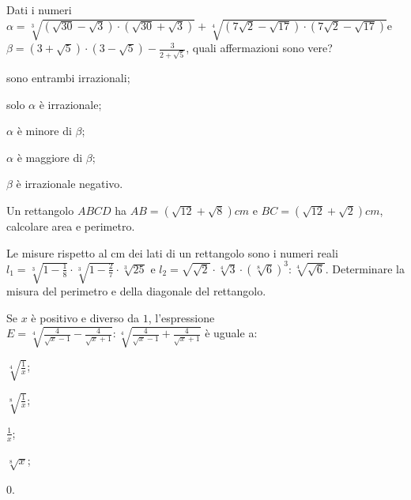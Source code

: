 \begin{esercizio}%
Dati i numeri\quad $\alpha =\sqrt[3]{(\sqrt{30}-\sqrt 3)\cdot (\sqrt{30}+\sqrt 3)}+\sqrt[4]{(7\sqrt 2-\sqrt{17})\cdot (7\sqrt 2-\sqrt{17})}$\quad e $\beta =(3+\sqrt 5)\cdot (3-\sqrt 5)-\frac 3{2+\sqrt 5}$, quali affermazioni sono vere?
\begin{multicols}{2}
\begin{enumeratea}
 \item sono entrambi irrazionali;
 \item solo $\alpha$ è irrazionale;
 \item $\alpha$ è minore di $\beta$;
 \item $\alpha$ è maggiore di $\beta$;
 \item $\beta$ è irrazionale negativo.
\end{enumeratea}
\end{multicols}
\end{esercizio}

\begin{esercizio}%
Un rettangolo $ABCD$ ha $AB=(\sqrt{12}+\sqrt{8})\unit{cm}$ e $BC=(\sqrt{12}+\sqrt{2})\unit{cm}$, calcolare area e perimetro.
\end{esercizio}

\begin{esercizio}%
Le misure rispetto al cm dei lati di un rettangolo sono i numeri reali $l_1=\sqrt[3]{1-\frac 1 8}\cdot \sqrt[3]{1-\frac 2 7}\cdot \sqrt[3]{25}$ e $l_2=\sqrt{\sqrt 2}\cdot \sqrt[4]3\cdot (\sqrt[8]6)^3:\sqrt[4]{\sqrt 6}$. Determinare la misura del perimetro e della diagonale del rettangolo.
\end{esercizio}

\begin{esercizio}%
Se $x$ è positivo e diverso da $1$, l'espressione $E=\sqrt[4]{\frac 4{\sqrt x-1}-\frac 4{\sqrt x+1}}:\sqrt[4]{\frac 4{\sqrt x-1}+\frac 4{\sqrt x+1}}$ è uguale a:
\begin{multicols}{5}
\begin{enumeratea}
 \item $\sqrt[4]{\frac 1 x}$;
 \item $\sqrt[8]{\frac 1 x}$;
 \item $\frac 1 x$;
 \item $\sqrt[8]x$;
 \item $0$.
\end{enumeratea}
\end{multicols}
\end{esercizio}

